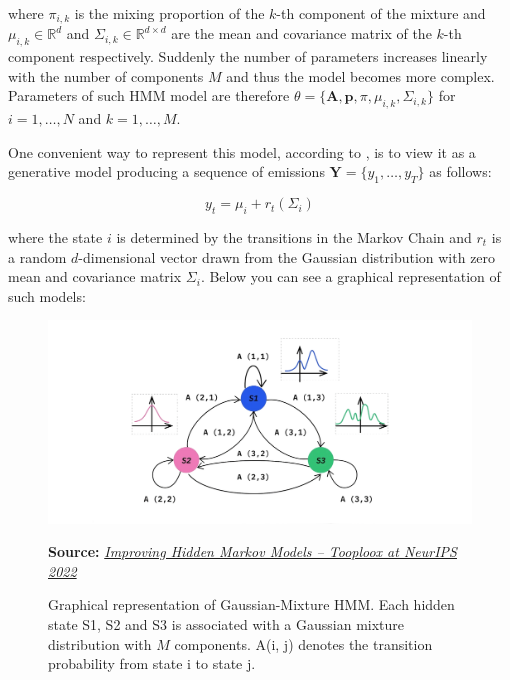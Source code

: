 where $\pi_{i,k}$ is the mixing proportion of the $k$-th component of the mixture and $\mu_{i,k} \in \mathbb{R}^d$ and $\Sigma_{i,k} \in \mathbb{R}^{d \times d}$ are the mean and covariance matrix of the $k$-th component respectively. Suddenly the number of parameters
increases linearly with the number of components $M$ and thus the model becomes more complex. Parameters of such HMM model are therefore $\theta = \{\textbf{A},\textbf{p},\pi,\mu_{i,k},\Sigma_{i,k}\}$ for $i=1,\ldots, N$ and $k=1,\ldots, M$.

One convenient way to represent this model, according to \citep{Yu2015}, is to view it as a generative model producing a sequence of emissions $\textbf{Y} = \{y_1,\ldots,y_T\}$ as follows:

\begin{equation}
    y_t = \mu_{i} + r_t(\Sigma_{i})
\end{equation}

where the state $i$ is determined by the transitions in the Markov Chain and $r_t$ is a random $d$-dimensional vector drawn from the Gaussian distribution with zero mean and covariance matrix $\Sigma_{i}$.
Below you can see a graphical representation of such models:

\begin{figure}[htbp]
    \begin{center}
        \includegraphics[width=1.0\textwidth]{Figs/gaussian_hmm.png}
        \caption*{\textbf{Source:} \href{https://tooploox.com/improving-hidden-markov-models-tooploox-at-neurips-2022s}{\textit{Improving Hidden Markov Models – Tooploox at NeurIPS 2022}}}
        \caption[Diagram of Gaussian Hidden Markov Model representation]{Graphical representation of Gaussian-Mixture HMM. Each hidden state S1, S2 and S3 is associated with a Gaussian mixture distribution with $M$ components. A(i, j) denotes the transition probability from state i to state j.}
        \label{fig:guaussian_hmm}
    \end{center}
\end{figure}

